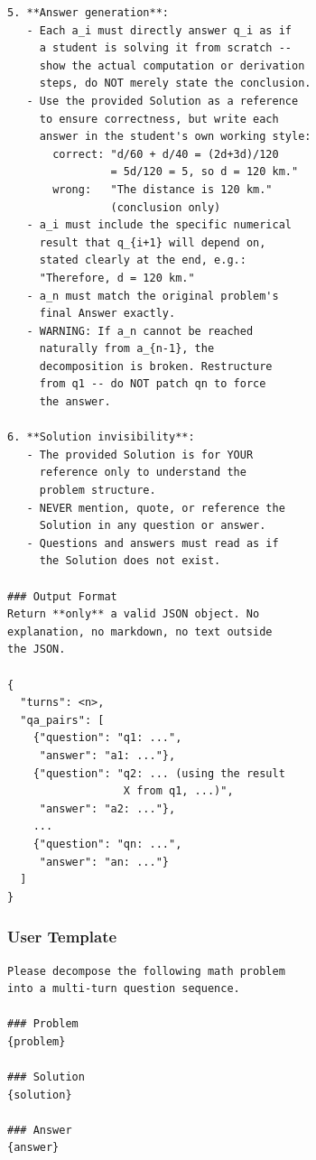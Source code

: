 \begin{small}
\begin{lstlisting}[basicstyle=\ttfamily\footnotesize, breaklines=true, breakatwhitespace=false, columns=flexible, keepspaces=true]
5. **Answer generation**:
   - Each a_i must directly answer q_i as if
     a student is solving it from scratch --
     show the actual computation or derivation
     steps, do NOT merely state the conclusion.
   - Use the provided Solution as a reference
     to ensure correctness, but write each
     answer in the student's own working style:
       correct: "d/60 + d/40 = (2d+3d)/120
                = 5d/120 = 5, so d = 120 km."
       wrong:   "The distance is 120 km."
                (conclusion only)
   - a_i must include the specific numerical
     result that q_{i+1} will depend on,
     stated clearly at the end, e.g.:
     "Therefore, d = 120 km."
   - a_n must match the original problem's
     final Answer exactly.
   - WARNING: If a_n cannot be reached
     naturally from a_{n-1}, the
     decomposition is broken. Restructure
     from q1 -- do NOT patch qn to force
     the answer.

6. **Solution invisibility**:
   - The provided Solution is for YOUR
     reference only to understand the
     problem structure.
   - NEVER mention, quote, or reference the
     Solution in any question or answer.
   - Questions and answers must read as if
     the Solution does not exist.

### Output Format
Return **only** a valid JSON object. No
explanation, no markdown, no text outside
the JSON.

{
  "turns": <n>,
  "qa_pairs": [
    {"question": "q1: ...",
     "answer": "a1: ..."},
    {"question": "q2: ... (using the result
                  X from q1, ...)",
     "answer": "a2: ..."},
    ...
    {"question": "qn: ...",
     "answer": "an: ..."}
  ]
}
\end{lstlisting}
\end{small}

\subsubsection*{User Template}

\begin{small}
\begin{lstlisting}[basicstyle=\ttfamily\footnotesize, breaklines=true, breakatwhitespace=false, columns=flexible, keepspaces=true]
Please decompose the following math problem
into a multi-turn question sequence.

### Problem
{problem}

### Solution
{solution}

### Answer
{answer}
\end{lstlisting}
\end{small}

